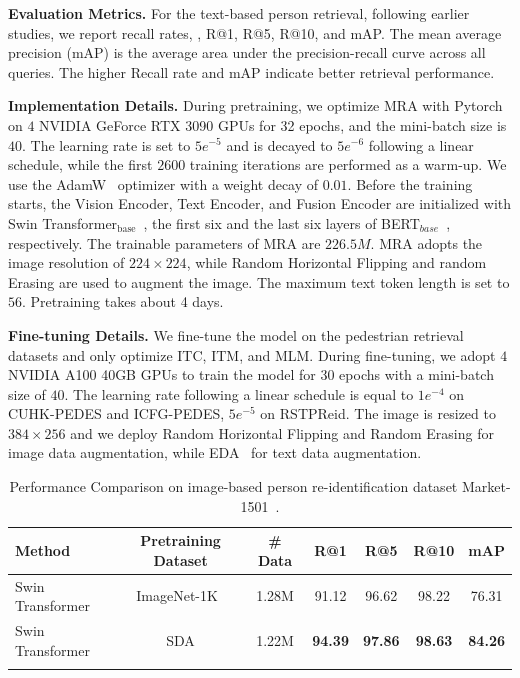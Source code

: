 \noindent\textbf{Evaluation Metrics.} 
For the text-based person retrieval, following earlier studies, we report recall rates, \eg, R@1, R@5,  R@10, and mAP.  The mean average precision (mAP) is the average area under the precision-recall curve across all queries. The higher Recall rate and mAP indicate better retrieval performance.


\noindent\textbf{Implementation Details.}
During pretraining, we optimize MRA with Pytorch on $4$ NVIDIA GeForce RTX 3090 GPUs for 32 epochs, and the mini-batch size is $40$. 
The learning rate is set to $5e^{-5}$ and is decayed to $5e^{-6}$ following a linear schedule, while the first $2600$ training iterations are performed as a warm-up. 
We use the AdamW~\cite{loshchilov2018decoupled} optimizer with a weight decay of $0.01$.
Before the training starts, the Vision Encoder, Text Encoder, and Fusion Encoder are initialized with Swin Transformer$_{\text{base}}$~\cite{liu2021swin}, the first six and the last six layers of BERT$_{base}$~\cite{devlin2019bert}, respectively. 
The trainable parameters of MRA are $226.5M$.
MRA adopts the image resolution of $224 \times 224$, while Random Horizontal Flipping and random Erasing are used to augment the image. 
The maximum text token length is set to $56$. 
Pretraining takes about 4 days.

\noindent\textbf{Fine-tuning Details.}
We fine-tune the model on the pedestrian retrieval datasets and only optimize ITC, ITM, and MLM.
During fine-tuning, we adopt $4$ NVIDIA A100 40GB GPUs to train the model for $30$ epochs with a mini-batch size of $40$. 
The learning rate following a linear schedule is equal to $1e^{-4}$ on CUHK-PEDES and ICFG-PEDES, $5e^{-5}$ on RSTPReid. 
The image is resized to $384 \times 256$ and we deploy Random Horizontal Flipping and Random Erasing for image data augmentation, while EDA~\cite{wei2019eda} for text data augmentation.




\begin{table}[!t]
\caption{Performance Comparison on image-based person re-identification dataset Market-1501~\cite{zheng2015scalable}.
}
\label{tab: reid}
\small
\centering
\begin{tabular}{l|c|c|cccc}
\shline
Method & Pretraining Dataset & \# Data & R@1 & R@5 & R@10 & mAP \\
\hline
Swin Transformer   & ImageNet-1K~\cite{deng2009imagenet} & 1.28M & 91.12 & 96.62 & 98.22 & 76.31 \\
Swin Transformer & SDA & 1.22M & \textbf{94.39} & \textbf{97.86} & \textbf{98.63} & \textbf{84.26} \\
\shline
\end{tabular}
\end{table}


